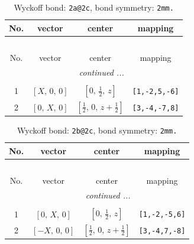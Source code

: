 \documentclass[fleqn,8pt]{jsarticle}
\begin{document}
\begin{longtable}{cccc}
\caption{Wyckoff bond: {\tt 2a@2c}, bond symmetry: {\tt 2mm.}}
 \\
 \hline \hline
No. & vector & center & mapping \\ \hline \endfirsthead

\multicolumn{3}{l}{\tablename\ \thetable{}} \\
 \hline \hline
No. & vector & center & mapping \\ \hline \endhead

 \hline \hline
\multicolumn{3}{r}{\footnotesize\it continued ...} \\ \endfoot

 \hline \hline
\multicolumn{3}{r}{} \\ \endlastfoot

1 & $\left[ X,\, 0,\, 0 \right]$ & $\left[ 0,\, \frac{1}{2},\, z \right]$ & {\tt [1,-2,5,-6]} \\ \hline
2 & $\left[ 0,\, X,\, 0 \right]$ & $\left[ \frac{1}{2},\, 0,\, z + \frac{1}{2} \right]$ & {\tt [3,-4,-7,8]} \\
\end{longtable}
\renewcommand{\arraystretch}{1.2}
\begin{longtable}{cccc}
\caption{Wyckoff bond: {\tt 2b@2c}, bond symmetry: {\tt 2mm.}}
 \\
 \hline \hline
No. & vector & center & mapping \\ \hline \endfirsthead

\multicolumn{3}{l}{\tablename\ \thetable{}} \\
 \hline \hline
No. & vector & center & mapping \\ \hline \endhead

 \hline \hline
\multicolumn{3}{r}{\footnotesize\it continued ...} \\ \endfoot

 \hline \hline
\multicolumn{3}{r}{} \\ \endlastfoot

1 & $\left[ 0,\, X,\, 0 \right]$ & $\left[ 0,\, \frac{1}{2},\, z \right]$ & {\tt [1,-2,-5,6]} \\ \hline
2 & $\left[ - X,\, 0,\, 0 \right]$ & $\left[ \frac{1}{2},\, 0,\, z + \frac{1}{2} \right]$ & {\tt [3,-4,7,-8]} \\
\end{longtable}
\renewcommand{\arraystretch}{1.2}
\end{document}

